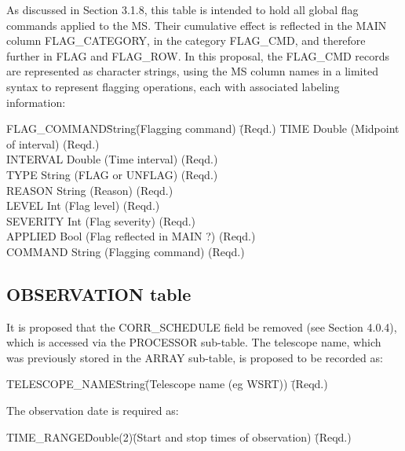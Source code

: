 \documentclass{article}
\begin{document}
\begin{itemize}
As discussed in Section 3.1.8, this table is intended to hold all
global flag commands applied to the MS. Their cumulative effect is
reflected in the MAIN column FLAG\_CATEGORY, in the category FLAG\_CMD,
and therefore further in FLAG and FLAG\_ROW. In this proposal, the
FLAG\_CMD records are represented as character strings, using the MS
column names in a limited syntax to represent flagging operations,
each with associated labeling information:

\begin{tabbing} 
FLAG\_COMMAND\quad\quad\quad\quad \= String\quad\quad \= (Flagging command)
\quad\quad\quad\quad \= (Reqd.) \kill
TIME \> Double \> (Midpoint of interval) \> (Reqd.) \\
INTERVAL \> Double \> (Time interval) \> (Reqd.) \\
TYPE \> String \> (FLAG or UNFLAG) \> (Reqd.) \\
REASON \> String \> (Reason) \> (Reqd.) \\
LEVEL  \> Int    \> (Flag level) \> (Reqd.) \\
SEVERITY \> Int \> (Flag severity) \> (Reqd.) \\
APPLIED \> Bool \> (Flag reflected in MAIN ?) \> (Reqd.) \\
COMMAND \> String \> (Flagging command) \> (Reqd.) \\
\end{tabbing}

\subsection{OBSERVATION table}

It is proposed that the CORR\_SCHEDULE field be removed (see Section
4.0.4), which is accessed via the PROCESSOR sub-table. The telescope
name, which was previously stored in the ARRAY sub-table, is proposed
to be recorded as:

\begin{tabbing} 
TELESCOPE\_NAME\quad\quad \= String\quad\quad \= (Telescope name (eg WSRT))
 \quad\quad \= (Reqd.) \\
\end{tabbing}

The observation date is required as:

\begin{tabbing} 
TIME\_RANGE\quad\quad \= Double(2)\quad\quad \= 
(Start and stop times of observation)
 \quad\quad \= (Reqd.) \\
\end{tabbing}


\end{itemize}
\end{document}

